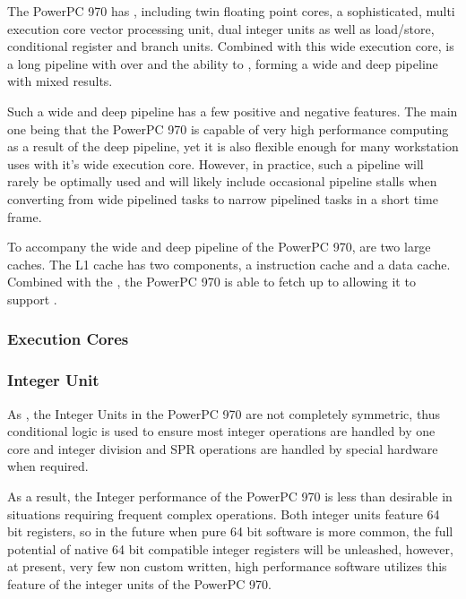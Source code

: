 \documentclass[a4paper,12pt]{article}
\begin{document}
The PowerPC 970 has \cite[12 seperate execution cores]{a5}, including 
twin floating point cores, a sophisticated, multi execution core vector 
processing unit, dual integer units as well
as load/store, conditional register and branch units. Combined with this
wide execution core, is a long pipeline with over 
\cite[100 execution slots]{a1} and the ability to \cite[support 215
instructions (in various execution stages) in flight]{a5}, forming a wide 
and deep pipeline with mixed results.


Such a wide and deep pipeline has a few positive and negative features.
The main one being that the PowerPC 970 is capable of very high
performance computing as a result of the deep pipeline, yet it is also
flexible enough for many workstation uses with it's wide execution core.
However, in practice, such a pipeline will rarely be optimally used and
will likely include occasional pipeline stalls when converting from wide
pipelined tasks to narrow pipelined tasks in a short time frame.


To accompany the wide and deep pipeline of the PowerPC 970, are two
large caches. The L1 cache has two components, a \cite[64kb directly
mapped]{a1} instruction cache and a \cite[32kb 2 way assocciative]{a1}
data cache. Combined with the \cite[512KB L2 Cache]{a2}, the PowerPC 970
is able to fetch up to \cite[8 instructions per clock cycle]{a5} allowing
it to support \cite[fetching of upto 8 prefetch data streams]{a2}.

\subsubsection{Execution Cores}

\subsubsection{Integer Unit}

As \cite[discussed in detail]{a2}, the Integer Units in the PowerPC 970 are not
completely symmetric, thus conditional logic is used to ensure 
most integer operations are handled by one core and integer division 
and SPR operations are handled by special hardware when required.


As a result, the Integer performance of the PowerPC 970 is less than desirable
in situations requiring frequent complex operations. Both integer units
feature 64 bit registers, so in the future when pure 64 bit software is
more common, the full potential of native 64 bit compatible integer
registers will be unleashed, however, at present, very few non custom
written, high performance software utilizes this feature of the integer
units of the PowerPC 970.
 
\end{document}

